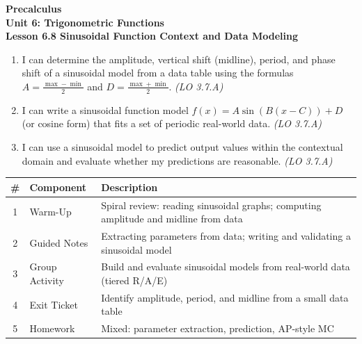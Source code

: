 \documentclass[10pt]{article}
\begin{document}
\vspace{-0.8in}

\begin{center}
  {\color{white}\textbf{\LARGE Precalculus}}\\[4pt]
  {\color{skymid}\large\textbf{Unit 6: Trigonometric Functions}}\\[6pt]
  {\color{white}\textbf{\large Lesson 6.8 \quad Sinusoidal Function Context and Data Modeling}}
\end{center}

\vspace{0.22in}
\namedateperiod
\vspace{0.18in}

\begin{learningtargetbox}
\small
\begin{enumerate}[leftmargin=1.5em, itemsep=5pt]
  \item I can determine the amplitude, vertical shift (midline), period, and phase shift of a
    sinusoidal model from a data table using the formulas
    $A = \tfrac{\max - \min}{2}$ and $D = \tfrac{\max + \min}{2}$. \hfill\textit{(LO 3.7.A)}
  \item I can write a sinusoidal function model $f(x) = A\sin(B(x-C))+D$ (or cosine form)
    that fits a set of periodic real-world data. \hfill\textit{(LO 3.7.A)}
  \item I can use a sinusoidal model to predict output values within the contextual domain
    and evaluate whether my predictions are reasonable. \hfill\textit{(LO 3.7.A)}
\end{enumerate}
\end{learningtargetbox}

\vspace{0.14in}

\begin{tocbox}
\small
\renewcommand{\arraystretch}{1.5}
\begin{tabularx}{\linewidth}{@{} c l X @{}}
\rowcolor{sky}
\textbf{\#} & \textbf{Component} & \textbf{Description} \\
\midrule
1 & Warm-Up        & Spiral review: reading sinusoidal graphs; computing amplitude and midline from data \\
2 & Guided Notes   & Extracting parameters from data; writing and validating a sinusoidal model \\
3 & Group Activity & Build and evaluate sinusoidal models from real-world data (tiered R/A/E) \\
4 & Exit Ticket    & Identify amplitude, period, and midline from a small data table \\
5 & Homework       & Mixed: parameter extraction, prediction, AP-style MC \\
\end{tabularx}
\end{tocbox}
\end{document}
